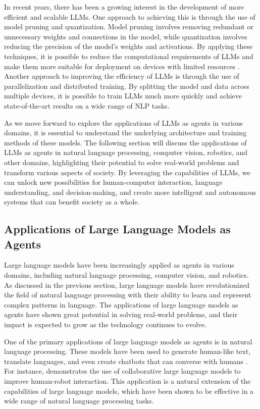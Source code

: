 \documentclass[11pt]{article}
\begin{document}
In recent years, there has been a growing interest in the development of more efficient and scalable LLMs. One approach to achieving this is through the use of model pruning and quantization. Model pruning involves removing redundant or unnecessary weights and connections in the model, while quantization involves reducing the precision of the model's weights and activations. By applying these techniques, it is possible to reduce the computational requirements of LLMs and make them more suitable for deployment on devices with limited resources \cite{ref17}. Another approach to improving the efficiency of LLMs is through the use of parallelization and distributed training. By splitting the model and data across multiple devices, it is possible to train LLMs much more quickly and achieve state-of-the-art results on a wide range of NLP tasks.

As we move forward to explore the applications of LLMs as agents in various domains, it is essential to understand the underlying architecture and training methods of these models. The following section will discuss the applications of LLMs as agents in natural language processing, computer vision, robotics, and other domains, highlighting their potential to solve real-world problems and transform various aspects of society. By leveraging the capabilities of LLMs, we can unlock new possibilities for human-computer interaction, language understanding, and decision-making, and create more intelligent and autonomous systems that can benefit society as a whole.

\subsection{Applications of Large Language Models as Agents}

Large language models have been increasingly applied as agents in various domains, including natural language processing, computer vision, and robotics. As discussed in the previous section, large language models have revolutionized the field of natural language processing with their ability to learn and represent complex patterns in language. The applications of large language models as agents have shown great potential in solving real-world problems, and their impact is expected to grow as the technology continues to evolve.

One of the primary applications of large language models as agents is in natural language processing. These models have been used to generate human-like text, translate languages, and even create chatbots that can converse with humans \cite{ref18}. For instance, \cite{ref19} demonstrates the use of collaborative large language models to improve human-robot interaction. This application is a natural extension of the capabilities of large language models, which have been shown to be effective in a wide range of natural language processing tasks.
\end{document}

